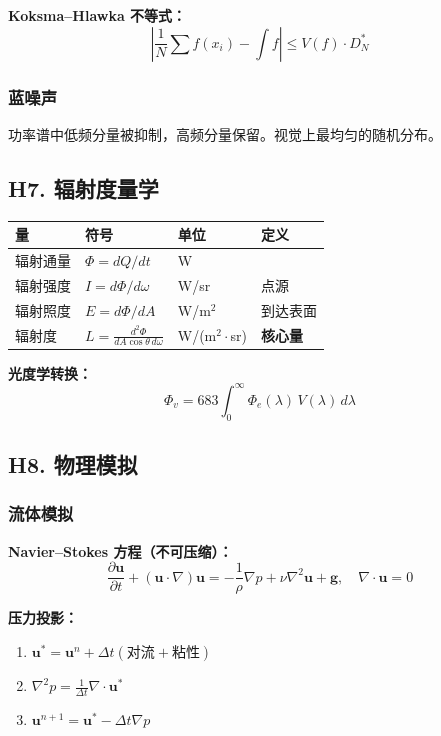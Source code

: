 \textbf{Koksma--Hlawka 不等式：}
\[
\left|\frac{1}{N}\sum f(x_i) - \int f\right| \leq V(f) \cdot D_N^*
\]

\subsubsection{蓝噪声}

功率谱中低频分量被抑制，高频分量保留。视觉上最均匀的随机分布。

\subsection{H7. 辐射度量学}

\begin{center}
\begin{tabular}{llll}
\toprule
\textbf{量} & \textbf{符号} & \textbf{单位} & \textbf{定义} \\
\midrule
辐射通量 & $\Phi = dQ/dt$ & W & \\
辐射强度 & $I = d\Phi/d\omega$ & W/sr & 点源 \\
辐射照度 & $E = d\Phi/dA$ & W/m$^2$ & 到达表面 \\
辐射度 & $L = \frac{d^2\Phi}{dA\cos\theta\,d\omega}$ & W/(m$^2\cdot$sr) & \textbf{核心量} \\
\bottomrule
\end{tabular}
\end{center}

\textbf{光度学转换：}
\[
\Phi_v = 683 \int_0^\infty \Phi_e(\lambda)\, V(\lambda)\, d\lambda
\]

\subsection{H8. 物理模拟}

\subsubsection{流体模拟}
\label{subsec:cg-fluid}

\textbf{Navier--Stokes 方程（不可压缩）：}
\[
\frac{\partial \mathbf{u}}{\partial t} + (\mathbf{u}\cdot\nabla)\mathbf{u} = -\frac{1}{\rho}\nabla p + \nu\nabla^2\mathbf{u} + \mathbf{g}, \quad \nabla \cdot \mathbf{u} = 0
\]

\textbf{压力投影：}
\begin{enumerate}
  \item $\mathbf{u}^* = \mathbf{u}^n + \Delta t(\text{对流} + \text{粘性})$
  \item $\nabla^2 p = \frac{1}{\Delta t}\nabla\cdot\mathbf{u}^*$
  \item $\mathbf{u}^{n+1} = \mathbf{u}^* - \Delta t\nabla p$
\end{enumerate}

